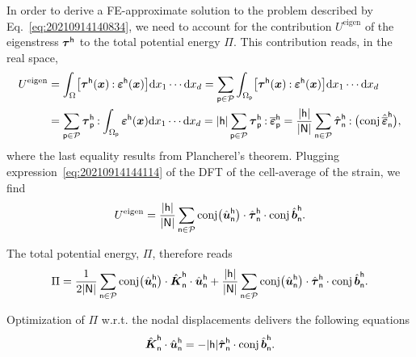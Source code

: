 In order to derive a FE-approximate solution to the problem described by
Eq.~\eqref{eq:20210914140834}, we need to account for the contribution
\(U^\text{eigen}\) of the eigenstress \(\boldsymbol\tau^\mathsf{h}\) to the total
potential energy \(\Pi\). This contribution reads, in the real space,
\begin{equation}
  \begin{aligned}[b]
    U^\text{eigen}&=\int_\Omega\bigl[\boldsymbol\tau^\mathsf{h}(\boldsymbol x)
    \mathbin{\mathord{:}}\boldsymbol\varepsilon^\mathsf{h}(\boldsymbol x)\bigr]\mathrm d x_1\cdots\mathrm d x_d
    =\sum_{\mathsf{p}\in\mathcal{P}}\int_{\Omega_\mathsf{p}}\bigl[\boldsymbol
    \tau^\mathsf{h}(\boldsymbol x)\mathbin{\mathord{:}}\boldsymbol\varepsilon^\mathsf{h}(\boldsymbol x)\bigr]\mathrm d x_1
    \cdots\mathrm d x_d\\
    &=\sum_{\mathsf{p}\in\mathcal{P}}\boldsymbol\tau_\mathsf{p}^\mathsf{h}\mathbin{\mathord{:}}
    \int_{\Omega_\mathsf{p}}\boldsymbol\varepsilon^\mathsf{h}(\boldsymbol x)\mathrm d x_1\cdots\mathrm d x_d
    =\lvert\mathsf{h}\rvert\sum_{\mathsf{p}\in\mathcal{P}}\boldsymbol\tau_\mathsf{p}^\mathsf{h}
    \mathbin{\mathord{:}}\overline{\boldsymbol\varepsilon}_\mathsf{p}^\mathsf{h}
    =\frac{\lvert\mathsf{h}\rvert}{\lvert\mathsf{N}\rvert}\sum_{\mathsf{n}\in\mathcal{P}}
    \hat{\boldsymbol\tau}_\mathsf{n}^\mathsf{h}\mathbin{\mathord{:}}\bigl(\operatorname{conj}
    \hat{\overline{\boldsymbol\varepsilon}}_\mathsf{n}^\mathsf{h}\bigr),
  \end{aligned}
\end{equation}
where the last equality results from Plancherel's theorem. Plugging
expression~\eqref{eq:20210914144114} of the DFT of the cell-average of the
strain, we find
\begin{equation}
  U^\text{eigen}=\frac{\lvert\mathsf{h}\rvert}{\lvert\mathsf{N}\rvert}
  \sum_{\mathsf{n}\in\mathcal{P}}\operatorname{conj}\bigl(\hat{\boldsymbol u}_\mathsf{n}^\mathsf{h}
  \bigr)\cdot\hat{\boldsymbol\tau}_\mathsf{n}^\mathsf{h}\cdot
  \operatorname{conj}\hat{\boldsymbol b}_\mathsf{n}^\mathsf{h}.
\end{equation}

The total potential energy, \(\Pi\), therefore reads
\begin{equation}
  \Pi=\frac 1{2\lvert\mathsf{N}\rvert}\sum_{\mathsf{n}\in\mathcal{P}}\operatorname{conj}\bigl(
  \hat{\boldsymbol u}_\mathsf{n}^\mathsf{h}\bigr)\cdot\hat{\boldsymbol K}_\mathsf{n}^\mathsf{h}
  \cdot\hat{\boldsymbol u}_\mathsf{n}^\mathsf{h}+\frac{\lvert\mathsf{h}\rvert}
  {\lvert\mathsf{N}\rvert}\sum_{\mathsf{n}\in\mathcal{P}}\operatorname{conj}\bigl(
  \hat{\boldsymbol u}_\mathsf{n}^\mathsf{h}\bigr)\cdot\hat{\boldsymbol\tau}_\mathsf{n}^\mathsf{h}
  \cdot\operatorname{conj}\hat{\boldsymbol b}_\mathsf{n}^\mathsf{h}.
\end{equation}

Optimization of \(\Pi\) w.r.t. the nodal displacements delivers the following
equations
\begin{equation}
  \label{eq:20210914145137}
  \hat{\boldsymbol K}_\mathsf{n}^\mathsf{h}\cdot\hat{\boldsymbol u}_\mathsf{n}^\mathsf{h}
  =-\lvert\mathsf{h}\rvert\hat{\boldsymbol\tau}_\mathsf{n}^\mathsf{h}\cdot\operatorname{conj}
  \hat{\boldsymbol b}_\mathsf{n}^\mathsf{h}.
\end{equation}

